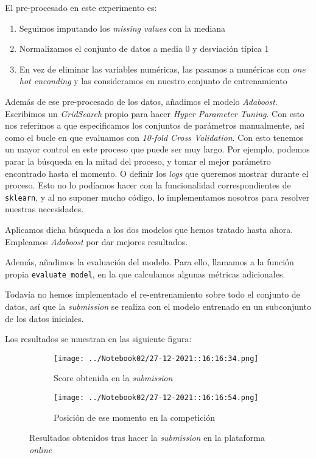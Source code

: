 \documentclass[11pt]{article}
\begin{document}
El pre-procesado en este experimento es:

\begin{enumerate}
    \item Seguimos imputando los \emph{missing values} con la mediana
    \item Normalizamos el conjunto de datos a media 0 y desviación típica 1
    \item En vez de eliminar las variables numéricas, las pasamos a numéricas con \emph{one hot enconding} y las consideramos en nuestro conjunto de entrenamiento
\end{enumerate}

Además de ese pre-procesado de los datos, añadimos el modelo \emph{Adaboost}. Escribimos un \emph{GridSearch} propio para hacer \emph{Hyper Parameter Tuning}. Con esto nos referimos a que especificamos los conjuntos de parámetros manualmente, así como el bucle en que evaluamos con \emph{10-fold Cross Validation}. Con esto tenemos un mayor control en este proceso que puede ser muy largo. Por ejemplo, podemos parar la búsqueda en la mitad del proceso, y tomar el mejor parámetro encontrado hasta el momento. O definir los \emph{logs} que queremos mostrar durante el proceso. Esto no lo podíamos hacer con la funcionalidad correspondientes de \lstinline{sklearn}, y al no suponer mucho código, lo implementamos nosotros para resolver nuestras necesidades.

Aplicamos dicha búsqueda a los dos modelos que hemos tratado hasta ahora. Empleamos \emph{Adaboost} por dar mejores resultados.

Además, añadimos la evaluación del modelo. Para ello, llamamos a la función propia \lstinline{evaluate_model}, en la que calculamos algunas métricas adicionales.

Todavía no hemos implementado el re-entrenamiento sobre todo el conjunto de datos, así que la \emph{submission} se realiza con el modelo entrenado en un subconjunto de los datos iniciales.

Los resultados se muestran en las siguiente figura:

\begin{figure}[H]
    \centering

    \begin{subfigure}[b]{0.45 \textwidth}
        \texttt{[image: ../Notebook02/27-12-2021::16:16:34.png]}
        \caption{Score obtenida en la \emph{submission}}
    \end{subfigure}
    \begin{subfigure}[b]{0.45 \textwidth}
        \texttt{[image: ../Notebook02/27-12-2021::16:16:54.png]}
        \caption{Posición de ese momento en la competición}
    \end{subfigure}

    \caption{Resultados obtenidos tras hacer la \emph{submission} en la plataforma \emph{online}}
\end{figure}
\end{document}
